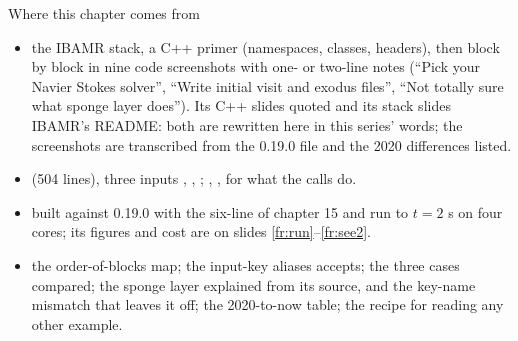 \documentclass[aspectratio=169,11pt]{beamer}
\begin{document}
\begin{frame}{Where this chapter comes from}
\label{fr:sources}
\scriptsize
\begin{itemize}
  \item {} the IBAMR stack, a C++ primer (namespaces, classes, headers), then  block by block in nine code screenshots with one- or two-line notes (``Pick your Navier Stokes solver'', ``Write initial visit and exodus files'', ``Not totally sure what sponge layer does''). Its C++ slides quoted  and its stack slides IBAMR's README: both are rewritten here in this series' words; the screenshots are transcribed from the 0.19.0 file and the 2020 differences listed.
  \item {}  (504 lines), three inputs , , ; , ,  for what the calls do.
  \item {}  built against 0.19.0 with the six-line  of chapter 15 and run to $t = 2$ s on four cores; its figures and cost are on slides \ref{fr:run}--\ref{fr:see2}.
  \item {} the order-of-blocks map; the input-key aliases  accepts; the three cases compared; the sponge layer explained from its source, and the key-name mismatch that leaves it off; the 2020-to-now table; the recipe for reading any other example.
\end{itemize}
\end{frame}
\end{document}
